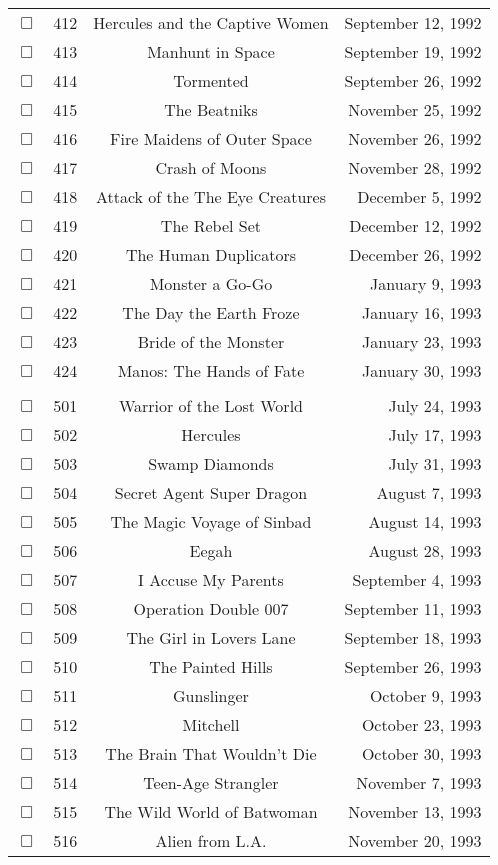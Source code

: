 \documentclass[12pt]{article}
\begin{document}
\begin{center}
\begin{longtable}[c]{cccr}
$\Box$&412&Hercules and the Captive Women&September 12, 1992\\
$\Box$&413&Manhunt in Space&September 19, 1992\\
$\Box$&414&Tormented&September 26, 1992\\
$\Box$&415&The Beatniks&November 25, 1992\\
$\Box$&416&Fire Maidens of Outer Space&November 26, 1992\\
$\Box$&417&Crash of Moons&November 28, 1992\\
$\Box$&418&Attack of the The Eye Creatures&December  5, 1992\\
$\Box$&419&The Rebel Set&December 12, 1992\\
$\Box$&420&The Human Duplicators&December 26, 1992\\
$\Box$&421&Monster a Go-Go&January  9, 1993\\
$\Box$&422&The Day the Earth Froze&January 16, 1993\\
$\Box$&423&Bride of the Monster&January 23, 1993\\
$\Box$&424&Manos: The Hands of Fate&January 30, 1993\\
\\
$\Box$&501&Warrior of the Lost World&July 24, 1993\\
$\Box$&502&Hercules&July 17, 1993\\
$\Box$&503&Swamp Diamonds&July 31, 1993\\
$\Box$&504&Secret Agent Super Dragon&August  7, 1993\\
$\Box$&505&The Magic Voyage of Sinbad&August 14, 1993\\
$\Box$&506&Eegah&August 28, 1993\\
$\Box$&507&I Accuse My Parents&September  4, 1993\\
$\Box$&508&Operation Double 007&September 11, 1993\\
$\Box$&509&The Girl in Lovers Lane&September 18, 1993\\
$\Box$&510&The Painted Hills&September 26, 1993\\
$\Box$&511&Gunslinger&October  9, 1993\\
$\Box$&512&Mitchell&October 23, 1993\\
$\Box$&513&The Brain That Wouldn't Die&October 30, 1993\\
$\Box$&514&Teen-Age Strangler&November  7, 1993\\
$\Box$&515&The Wild World of Batwoman&November 13, 1993\\
$\Box$&516&Alien from L.A.&November 20, 1993\\

\end{longtable}
\end{center}
\end{document}
